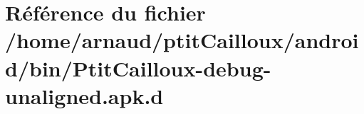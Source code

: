 \hypertarget{_ptit_cailloux-debug-unaligned_8apk_8d}{\section{Référence du fichier /home/arnaud/ptit\-Cailloux/android/bin/\-Ptit\-Cailloux-\/debug-\/unaligned.apk.\-d}
\label{_ptit_cailloux-debug-unaligned_8apk_8d}
}
